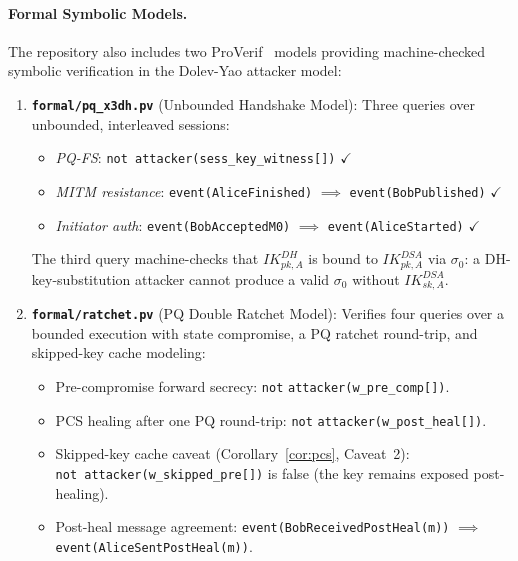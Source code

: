 \documentclass[11pt,a4paper]{article}
\theoremstyle{remark}
\theoremstyle{plain}
\begin{document}
\paragraph{Formal Symbolic Models.}
The repository also includes two ProVerif~\cite{proverif} models providing machine-checked
symbolic verification in the Dolev-Yao attacker model:
\begin{enumerate}
  \item \textbf{\texttt{formal/pq\_x3dh.pv}} (Unbounded Handshake Model):
        Three queries over unbounded, interleaved sessions:
        \begin{itemize}
          \item \textit{PQ-FS}:
                \texttt{not attacker(sess\_key\_witness[])} $\checkmark$
          \item \textit{MITM resistance}:
                \texttt{event(AliceFinished)} $\implies$
                \texttt{event(BobPublished)} $\checkmark$
          \item \textit{Initiator auth}:
                \texttt{event(BobAcceptedM0)} $\implies$
                \texttt{event(AliceStarted)} $\checkmark$
        \end{itemize}
        The third query machine-checks that $IK^{DH}_{pk,A}$ is bound to
        $IK^{DSA}_{pk,A}$ via $\sigma_0$: a DH-key-substitution attacker
        cannot produce a valid $\sigma_0$ without $IK^{DSA}_{sk,A}$.
  \item \textbf{\texttt{formal/ratchet.pv}} (PQ Double Ratchet Model): Verifies four queries
        over a bounded execution with state compromise, a PQ ratchet round-trip,
        and skipped-key cache modeling:
        \begin{itemize}
          \item Pre-compromise forward secrecy:
                \texttt{not} \texttt{attacker(w\_pre\_comp[])}.
          \item PCS healing after one PQ round-trip:
                \texttt{not} \texttt{attacker(w\_post\_heal[])}.
          \item Skipped-key cache caveat (Corollary~\ref{cor:pcs}, Caveat~2):\\
                \texttt{not attacker(w\_skipped\_pre[])} is false
                (the key remains exposed post-healing).
          \item Post-heal message agreement:
                \texttt{event(BobReceivedPostHeal(m))} $\implies$ \linebreak
                \null\hfill\texttt{event(AliceSentPostHeal(m))}.

\end{itemize}
\end{enumerate}
\end{document}
